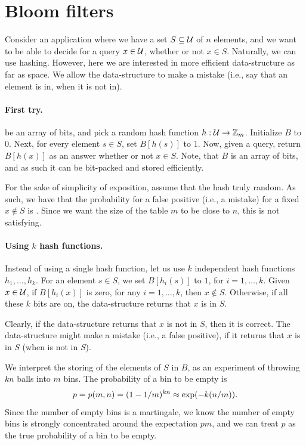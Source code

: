 \section{Bloom filters}

Consider an application where we have a set $S \subseteq \mathcal{U}$ of $n$
elements, and we want to be able to decide for a query $x \in \mathcal{U}$,
whether or not $x \in S$. Naturally, we can use hashing. However, here
we are interested in  more efficient data-structure as far as space. We
allow the data-structure to make a mistake (i.e., say that an element
is in, when it is not in).

\paragraph*{First try.}
 be an array of bits, and pick
a random hash function $h:\mathcal{U} \rightarrow \mathbb{Z}_m$. Initialize $B$ to
$0$. Next, for every element $s \in S$, set $B[h(s)]$ to $1$. Now,
given a query, return $B[h(x)]$ as an answer whether or not $x \in
S$. Note, that $B$ is an array of bits, and as such it can be
bit-packed and stored efficiently.

For the sake of simplicity of exposition, assume that the hash
 truly random. As such, we have that the
probability for a false positive (i.e., a mistake) for a fixed
$x \notin S$ is . Since we want the size of the table $m$ to be
close to $n$, this is not satisfying.


\paragraph*{Using $k$ hash functions.}
Instead of using a single hash function, let us use $k$ independent
hash functions $h_1, \ldots, h_k$. For an element $s \in S$, we set
$B[h_i(s)]$ to $1$, for $i=1,\ldots, k$.  Given  $x \in \mathcal{U}$,
if $B[h_i(x)]$ is zero, for any $i=1,\ldots, k$, then $x \notin
S$. Otherwise, if all these $k$ bits are on, the data-structure
returns that $x$ is in $S$.


Clearly, if the data-structure returns that $x$ is not in $S$, then it
is correct. The data-structure might make a mistake (i.e., a false
positive), if it returns that $x$ is in $S$ (when  is not in $S$).

We interpret the storing of the elements of $S$ in $B$, as an
experiment of throwing $kn$ balls into $m$ bins. The probability of a
bin to be empty is
\begin{equation*}
    p = p(m,n) = (1-1/m)^{kn} \approx \exp \pth{-k(n/m)}.
\end{equation*}
Since the number of empty bins is a martingale, we know the number of
empty bins is strongly concentrated around the expectation $p m$, and
we can treat $p$ as the true probability of a bin to be empty.

